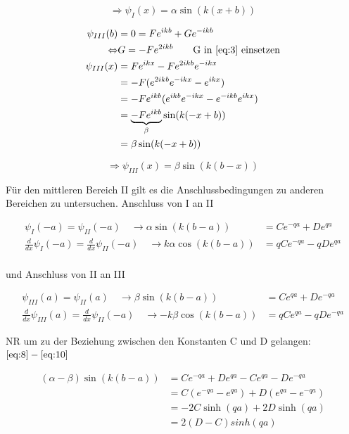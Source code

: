 \begin{equation}
  \label{eq:5}
  \Rightarrow \psi_I(x)=\alpha\sin(k(x+b))
\end{equation}

\begin{align}
  \label{eq:6}
  \psi_{III}(b) &= 0 = Fe^{ikb}+Ge^{-ikb} \\
\Leftrightarrow & G = -Fe^{2ikb}\qquad\text{G in }\ref{eq:3}\text{ einsetzen}\\
\psi_{III}(x)&=Fe^{ikx} -Fe^{2ikb} e^{-ikx} \\
&=-F(e^{2ikb}e^{-ikx}-e^{ikx})\\
&=-Fe^{ikb}(e^{ikb}e^{-ikx}-e^{-ikb}e^{ikx})\\
&=\underbrace{-Fe^{ikb} }_{\beta}\sin(k(-x+b))\\
&=\beta\sin(k(-x+b))
\end{align}

\begin{equation}
  \label{eq:7}
  \Rightarrow \psi_{III}(x)=\beta\sin(k(b-x))
\end{equation}

Für den mittleren Bereich II gilt es die Anschlussbedingungen zu anderen Bereichen zu untersuchen. Anschluss von I an II


\begin{align}
  \psi_{I}(-a) = \psi_{II}(-a) \quad\rightarrow    \alpha\sin(k(b-a)) &= Ce^{-qa}+De^{qa} \label{eq:8} \\
\frac{d}{dx}\psi_{I}(-a) =\frac{d}{dx}\psi_{II}(-a) \quad \rightarrow   k\alpha\cos(k(b-a)) &= qCe^{-qa}-qDe^{qa}\label{eq:9}
\end{align}
\\
und Anschluss von II an III

\begin{align}
  \psi_{III}(a) = \psi_{II}(a) \quad\rightarrow  \beta\sin(k(b-a)) &= Ce^{qa}+De^{-qa} \label{eq:10} \\
  \frac{d}{dx}\psi_{III}(a) =\frac{d}{dx}\psi_{II}(-a) \quad\rightarrow   -k\beta\cos(k(b-a)) &= qCe^{qa}-qDe^{-qa} \label{eq:11}
\end{align}

NR um zu der Beziehung zwischen den Konstanten C und D gelangen:
\( \eqref{eq:8}-\eqref{eq:10}  \)

\begin{align}
  \label{eq:12}
  (\alpha-\beta)\sin(k(b-a)) &= Ce^{-qa}+De^{qa}- Ce^{qa}-De^{-qa}\\
&= C(e^{-qa}- e^{qa})+D(e^{qa}-e^{-qa})\\
&=-2C\sinh(qa)+2D\sinh(qa)\\
&=2(D-C)sinh(qa)
\end{align}

